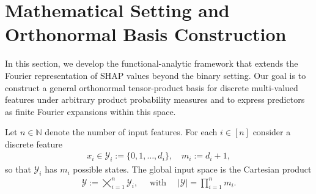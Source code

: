 \documentclass[letterpaper,11pt]{article}
\numberwithin{equation}{section}
\numberwithin{equation}{section}
\begin{document}






\section{Mathematical Setting and Orthonormal Basis Construction}
\label{section:mathematical:setting}

In this section, we develop the functional-analytic framework that extends the Fourier representation of SHAP values beyond the binary setting. Our goal is to construct a general orthonormal tensor-product basis for discrete multi-valued features under arbitrary product probability measures and to express predictors as finite Fourier expansions within this space.

Let $n\in \mathbb{N}$ denote the number of input features. For each $i\in [n]$ consider a discrete feature 
\begin{align*}
    x_i\in \mathcal{Y}_i:=\{0,1,\ldots, d_i\},\quad m_i:=d_i+1,
\end{align*}
so that $\mathcal{Y}_i$ has $m_i$ possible states. The global input space is the Cartesian product
\begin{align*} 
    \mathcal{Y}:=\bigtimes_{i=1}^n \mathcal{Y}_i,\quad \text{ with }\quad |\mathcal{Y}|=\prod_{i=1}^n m_i.
\end{align*}
\end{document}
